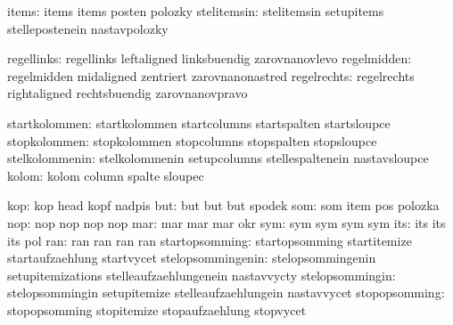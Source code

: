                         items:  items                        items
                                posten                       polozky
                  stelitemsin:  stelitemsin                  setupitems
                                stellepostenein              nastavpolozky

                   regellinks:  regellinks                   leftaligned
                                linksbuendig                 zarovnanovlevo
                  regelmidden:  regelmidden                  midaligned
                                zentriert                    zarovnanonastred
                  regelrechts:  regelrechts                  rightaligned
                                rechtsbuendig                zarovnanovpravo

                startkolommen:  startkolommen                startcolumns
                                startspalten                 startsloupce
                 stopkolommen:  stopkolommen                 stopcolumns
                                stopspalten                  stopsloupce
               stelkolommenin:  stelkolommenin               setupcolumns
                                stellespaltenein             nastavsloupce
                        kolom:  kolom                        column
                                spalte                       sloupec

                          kop:  kop                          head
                                kopf                         nadpis
                          but:  but                          but
                                but                          spodek %
                          som:  som                          item
                                pos                          polozka
                          nop:  nop                          nop
                                nop                          nop
                          mar:  mar                          mar
                                mar                          okr %
                          sym:  sym                          sym
                                sym                          sym
                          its:  its                          its
                                its                          pol %
                          ran:  ran                          ran
                                ran                          ran
               startopsomming:  startopsomming               startitemize
                                startaufzaehlung             startvycet
            stelopsommingenin:  stelopsommingenin            setupitemizations
                                stelleaufzaehlungenein       nastavvycty
              stelopsommingin:  stelopsommingin              setupitemize
                                stelleaufzaehlungein         nastavvycet
                stopopsomming:  stopopsomming                stopitemize
                                stopaufzaehlung              stopvycet


